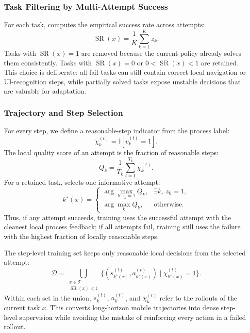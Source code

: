 \subsubsection{Task Filtering by Multi-Attempt Success}

For each task, \hifpo computes the empirical success rate across attempts:
\begin{equation}
\label{eq:success-rate}
    \operatorname{SR}(x)=\frac{1}{K}\sum_{k=1}^{K} z_k.
\end{equation}
Tasks with $\operatorname{SR}(x)=1$ are removed because the current policy already solves them consistently. Tasks with $\operatorname{SR}(x)=0$ or $0<\operatorname{SR}(x)<1$ are retained. This choice is deliberate: all-fail tasks can still contain correct local navigation or UI-recognition steps, while partially solved tasks expose unstable decisions that are valuable for adaptation.

\subsubsection{Trajectory and Step Selection}

For every step, we define a reasonable-step indicator from the process label:
\begin{equation}
\label{eq:reasonable-step}
    \chi_k^{(t)}=\mathbb{I}[v_k^{(t)}=1].
\end{equation}
The local quality score of an attempt is the fraction of reasonable steps:
\begin{equation}
\label{eq:quality-score}
    Q_k=\frac{1}{T_k}\sum_{t=1}^{T_k}\chi_k^{(t)}.
\end{equation}
For a retained task, \hifpo selects one informative attempt:
\begin{equation}
\label{eq:attempt-selection}
k^\star(x) =
\begin{cases}
\arg\max_{k:z_k=1} Q_k, & \exists k,\ z_k=1,\\
\arg\max_k Q_k, & \text{otherwise}.
\end{cases}
\end{equation}
Thus, if any attempt succeeds, training uses the successful attempt with the cleanest local process feedback; if all attempts fail, training still uses the failure with the highest fraction of locally reasonable steps.

The step-level training set keeps only reasonable local decisions from the selected attempt:
\begin{equation}
\label{eq:training-set}
    \mathcal{D}=
    \bigcup_{\substack{x\in\mathcal{T}\\ \operatorname{SR}(x)<1}}
    \{(s_{k^\star(x)}^{(t)},a_{k^\star(x)}^{(t)})\mid
    \chi_{k^\star(x)}^{(t)}=1\}.
\end{equation}
Within each set in the union, $s_k^{(t)}$, $a_k^{(t)}$, and $\chi_k^{(t)}$ refer to the rollouts of the current task $x$.
This converts long-horizon mobile trajectories into dense step-level supervision while avoiding the mistake of reinforcing every action in a failed rollout.

